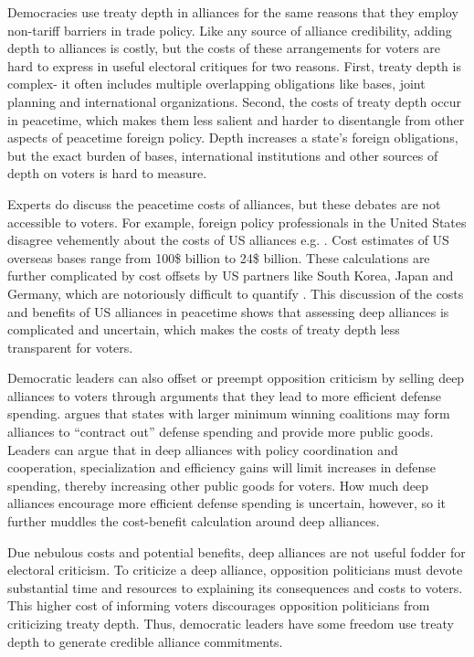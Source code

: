 \documentclass[12pt]{article}
\begin{document}
Democracies use treaty depth in alliances for the same reasons that they employ non-tariff barriers in trade policy.
Like any source of alliance credibility, adding depth to alliances is costly, but the costs of these arrangements for voters are hard to express in useful electoral critiques for two reasons.
First, treaty depth is complex- it often includes multiple overlapping obligations like bases, joint planning and international organizations.
Second, the costs of treaty depth occur in peacetime, which makes them less salient and harder to disentangle from other aspects of peacetime foreign policy. 
Depth increases a state's foreign obligations, but the exact burden of bases, international institutions and other sources of depth on voters is hard to measure. 


Experts do discuss the peacetime costs of alliances, but these debates are not accessible to voters. 
For example, foreign policy professionals in the United States disagree vehemently about the costs of US alliances e.g. \citep{Brooksetal2013, Posen2014, BrandsFeaver2017}.
Cost estimates of US overseas bases range from 100\$ billion \citep{Vine2015} to 24\$ billion. 
These calculations are further complicated by cost offsets by US partners like South Korea, Japan and Germany, which are notoriously difficult to quantify \citep{Lostumboetal2013}.  
This discussion of the costs and benefits of US alliances in peacetime shows that assessing deep alliances is complicated and uncertain, which makes the costs of treaty depth less transparent for voters. 


Democratic leaders can also offset or preempt opposition criticism by selling deep alliances to voters through arguments that they lead to more efficient defense spending. 
\citet{Kimball2010} argues that states with larger minimum winning coalitions may form alliances to ``contract out'' 
defense spending and provide more public goods. 
Leaders can argue that in deep alliances with policy coordination and cooperation, specialization and efficiency gains will limit increases in defense spending, thereby increasing other public goods for voters.  
How much deep alliances encourage more efficient defense spending is uncertain, however, so it further muddles the cost-benefit calculation around deep alliances. 


Due nebulous costs and potential benefits, deep alliances are not useful fodder for electoral criticism.
To criticize a deep alliance, opposition politicians must devote substantial time and resources to explaining its consequences and costs to voters.  
This higher cost of informing voters discourages opposition politicians from criticizing treaty depth. 
Thus, democratic leaders have some freedom use treaty depth to generate credible alliance commitments. 
\end{document}
